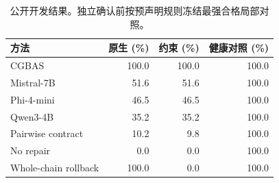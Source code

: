 \begin{table}[t]
\centering
\small
\caption{公开开发结果。独立确认前按预声明规则冻结最强合格局部对照。}
\begin{tabular}{lrrr}
\toprule
方法 & 原生 (\%) & 约束 (\%) & 健康对照 (\%) \\
\midrule
CGBAS & 100.0 & 100.0 & 100.0 \\
Mistral-7B & 51.6 & 51.6 & 100.0 \\
Phi-4-mini & 46.5 & 46.5 & 100.0 \\
Qwen3-4B & 35.2 & 35.2 & 100.0 \\
Pairwise contract & 10.2 & 9.8 & 100.0 \\
No repair & 0.0 & 0.0 & 100.0 \\
Whole-chain rollback & 100.0 & 0.0 & 100.0 \\
\bottomrule
\end{tabular}
\end{table}
